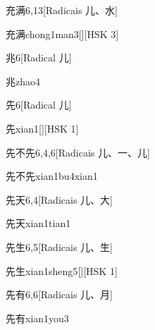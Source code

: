 \begin{entry}{充满}{6,13}[Radicais ⼉、⽔]
  \begin{phonetics}{充满}{chong1man3}[][HSK 3]
  \end{phonetics}
\end{entry}

\begin{entry}{兆}{6}[Radical ⼉]
  \begin{phonetics}{兆}{zhao4}
  \end{phonetics}
\end{entry}

\begin{entry}{先}{6}[Radical ⼉]
  \begin{phonetics}{先}{xian1}[][HSK 1]
  \end{phonetics}
\end{entry}

\begin{entry}{先不先}{6,4,6}[Radicais ⼉、⼀、⼉]
  \begin{phonetics}{先不先}{xian1bu4xian1}
  \end{phonetics}
\end{entry}

\begin{entry}{先天}{6,4}[Radicais ⼉、⼤]
  \begin{phonetics}{先天}{xian1tian1}
  \end{phonetics}
\end{entry}

\begin{entry}{先生}{6,5}[Radicais ⼉、⽣]
  \begin{phonetics}{先生}{xian1sheng5}[][HSK 1]
  \end{phonetics}
\end{entry}

\begin{entry}{先有}{6,6}[Radicais ⼉、⽉]
  \begin{phonetics}{先有}{xian1you3}
  \end{phonetics}
\end{entry}

